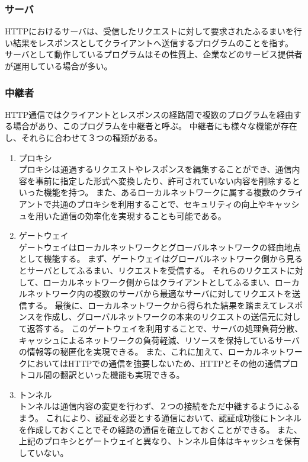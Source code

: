 \documentclass[12pt,a4paper]{jbook}
\begin{document}
\subsubsection{サーバ}
HTTPにおけるサーバは、受信したリクエストに対して要求されたふるまいを行い結果をレスポンスとしてクライアントへ送信するプログラムのことを指す。
サーバとして動作しているプログラムはその性質上、企業などのサービス提供者が運用している場合が多い。

\subsubsection{中継者}
\label{sec:intermediary}
HTTP通信ではクライアントとレスポンスの経路間で複数のプログラムを経由する場合があり、このプログラムを中継者と呼ぶ。
中継者にも様々な機能が存在し、それらに合わせて３つの種類がある。
\begin{enumerate}
\item プロキシ\\
プロキシは通過するリクエストやレスポンスを編集することができ、通信内容を事前に指定した形式へ変換したり、許可されていない内容を削除するといった機能を持つ。
また、あるローカルネットワークに属する複数のクライアントで共通のプロキシを利用することで、セキュリティの向上やキャッシュを用いた通信の効率化を実現することも可能である。
\item ゲートウェイ\\
ゲートウェイはローカルネットワークとグローバルネットワークの経由地点として機能する。
まず、ゲートウェイはグローバルネットワーク側から見るとサーバとしてふるまい、リクエストを受信する。
それらのリクエストに対して、ローカルネットワーク側からはクライアントとしてふるまい、ローカルネットワーク内の複数のサーバから最適なサーバに対してリクエストを送信する。
最後に、ローカルネットワークから得られた結果を踏まえてレスポンスを作成し、グローバルネットワークの本来のリクエストの送信元に対して返答する。
このゲートウェイを利用することで、サーバの処理負荷分散、キャッシュによるネットワークの負荷軽減、リソースを保持しているサーバの情報等の秘匿化を実現できる。
また、これに加えて、ローカルネットワークにおいてはHTTPでの通信を強要しないため、HTTPとその他の通信プロトコル間の翻訳といった機能も実現できる。
\item トンネル\\
トンネルは通信内容の変更を行わず、２つの接続をただ中継するようにふるまう。
これにより、認証を必要とする通信において、認証成功後にトンネルを作成しておくことでその経路の通信を確立しておくことができる。
また、上記のプロキシとゲートウェイと異なり、トンネル自体はキャッシュを保有していない。
\end{enumerate}
\end{document}
